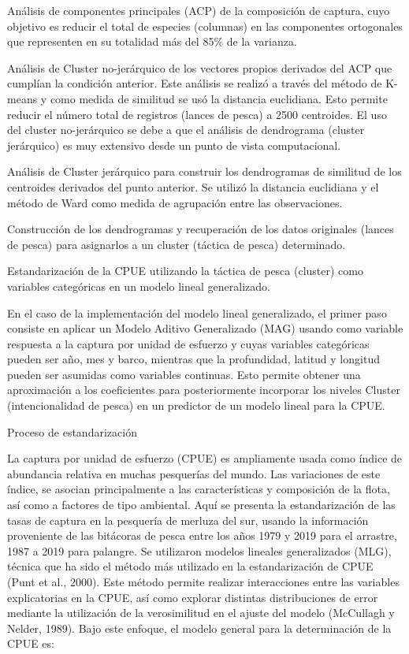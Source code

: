 \documentclass[
  spanish,
]{article}
\begin{document}
Análisis de componentes principales (ACP) de la composición de captura,
cuyo objetivo es reducir el total de especies (columnas) en las
componentes ortogonales que representen en su totalidad más del 85\% de
la varianza.

Análisis de Cluster no-jerárquico de los vectores propios derivados del
ACP que cumplían la condición anterior. Este análisis se realizó a
través del método de K-means y como medida de similitud se usó la
distancia euclidiana. Esto permite reducir el número total de registros
(lances de pesca) a 2500 centroides. El uso del cluster no-jerárquico se
debe a que el análisis de dendrograma (cluster jerárquico) es muy
extensivo desde un punto de vista computacional.

Análisis de Cluster jerárquico para construir los dendrogramas de
similitud de los centroides derivados del punto anterior. Se utilizó la
distancia euclidiana y el método de Ward como medida de agrupación entre
las observaciones.

Construcción de los dendrogramas y recuperación de los datos originales
(lances de pesca) para asignarlos a un cluster (táctica de pesca)
determinado.

Estandarización de la CPUE utilizando la táctica de pesca (cluster) como
variables categóricas en un modelo lineal generalizado.

En el caso de la implementación del modelo lineal generalizado, el
primer paso consiste en aplicar un Modelo Aditivo Generalizado (MAG)
usando como variable respuesta a la captura por unidad de esfuerzo y
cuyas variables categóricas pueden ser año, mes y barco, mientras que la
profundidad, latitud y longitud pueden ser asumidas como variables
continuas. Esto permite obtener una aproximación a los coeficientes para
posteriormente incorporar los niveles Cluster (intencionalidad de pesca)
en un predictor de un modelo lineal para la CPUE.

Proceso de estandarización

La captura por unidad de esfuerzo (CPUE) es ampliamente usada como
índice de abundancia relativa en muchas pesquerías del mundo. Las
variaciones de este índice, se asocian principalmente a las
características y composición de la flota, así como a factores de tipo
ambiental. Aquí se presenta la estandarización de las tasas de captura
en la pesquería de merluza del sur, usando la información proveniente de
las bitácoras de pesca entre los años 1979 y 2019 para el arrastre, 1987
a 2019 para palangre. Se utilizaron modelos lineales generalizados
(MLG), técnica que ha sido el método más utilizado en la estandarización
de CPUE (Punt et al., 2000). Este método permite realizar interacciones
entre las variables explicatorias en la CPUE, así como explorar
distintas distribuciones de error mediante la utilización de la
verosimilitud en el ajuste del modelo (McCullagh y Nelder, 1989). Bajo
este enfoque, el modelo general para la determinación de la CPUE es:
\end{document}
